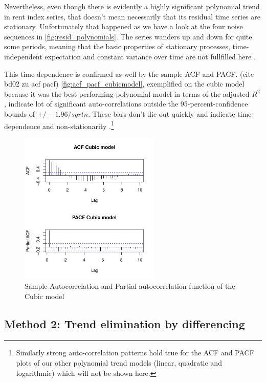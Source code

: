 \documentclass[11pt,a4paper]{article}
\begin{document}
Nevertheless, even though there is evidently a highly significant polynomial trend in rent index series, that doesn't mean necessarily that its residual time series are stationary.
Unfortunately that happened as we have a look at the four noise sequences in \cref{fig:resid_polynomials}.
The series wanders up and down for quite some periods, meaning that the basic properties of stationary processes, time-independent expectation and constant variance over time are not fullfilled here \cite[p.~49]{bd02}.

This time-dependence is confirmed as well by the sample ACF and PACF.
(cite bd02 zu acf pacf) \cref{fig:acf_pacf_cubicmodel}, exemplified on the cubic model because it was the best-performing polynomial model in terms of the adjusted $R^2$, indicate lot of significant auto-correlations outside the 95-percent-confidence bounds of $+/-1.96/sqrt{n}$.
These bars don't die out quickly and indicate time-dependence and non-stationarity \cite[p.~21]{bd02}.\footnote{
    Similarly strong auto-correlation patterns hold true for the ACF and PACF plots of our other polynomial trend models (linear, quadratic and logarithmic) which will not be shown here.
}


\begin{figure}
    \centering
    \includegraphics[width=0.6\textwidth]{acf_pacf_cubicmodel}
    \caption{Sample Autocorrelation and Partial autocorrelation function of the Cubic model}
    \label{fig:acf_cubicmodel}
\end{figure}


\subsection{Method 2: Trend elimination by differencing}
\end{document}
